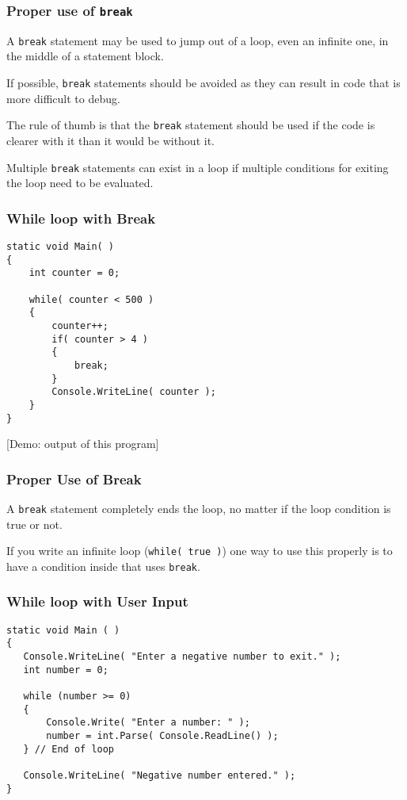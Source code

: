 \begin{frame}
\frametitle{Proper use of \texttt{break}}

A \texttt{break} statement may be used to jump out of a loop, even an infinite one, in the middle of a statement block.

If possible, \texttt{break} statements should be avoided as they can result in code that is more difficult to debug.

The rule of thumb is that the \texttt{break} statement should be used if the code is clearer with it than it would be without it.

Multiple \texttt{break} statements can exist in a loop if multiple conditions for exiting the loop need to be evaluated.

\end{frame}

\begin{frame}[fragile]
\frametitle{While loop with Break}

\begin{verbatim}
static void Main( )
{
    int counter = 0;

    while( counter < 500 )
    {
        counter++;
        if( counter > 4 )
        {
            break;
        }
        Console.WriteLine( counter );
    }
}
\end{verbatim}

[Demo: output of this program]

\end{frame}

\begin{frame}
\frametitle{Proper Use of Break}
A \texttt{break} statement completely ends the loop, no matter if the loop condition is true or not.

If you write an infinite loop (\texttt{while( true )}) one way to use this properly is to have a condition inside that uses \texttt{break}.

\end{frame}


\begin{frame}[fragile]
\frametitle{While loop with User Input}

\begin{verbatim}
static void Main ( )
{
   Console.WriteLine( "Enter a negative number to exit." );
   int number = 0;
    
   while (number >= 0) 
   {
       Console.Write( "Enter a number: " );
       number = int.Parse( Console.ReadLine() );
   } // End of loop
    
   Console.WriteLine( "Negative number entered." );
}    

\end{verbatim}
\end{frame}

